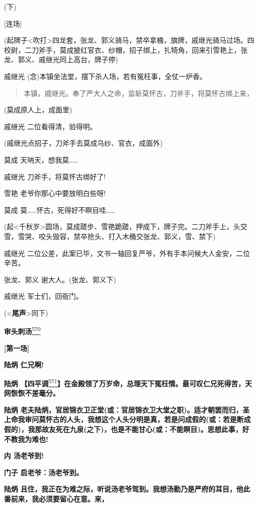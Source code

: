 (下)

{[}连场{]}

(起牌子\textless{}吹打\textgreater{}四龙套，张龙、郭义骑马，禁卒拿桶，旗牌，戚继光骑马过场。四校尉，二刀斧手，莫成披红官衣、纱帽，招子绑上，扎犄角，回来引雪艳上，张龙、郭义、戚继光同上高台，牌子停)

戚继光 (念)本镇坐法堂，摆下杀人场，若有冤枉事，全仗一炉香。

\begin{quote}
本镇，戚继光。奉了严大人之命，监斩莫怀古，刀斧手，将莫怀古绑上来，
\end{quote}

(莫成原人上，成面里)

戚继光 二位看得清，验得明。

(戚继光点招子，刀斧手去莫成乌纱、官衣，成面外)

莫成 天呐天，想我莫\ldots{}\ldots{}

戚继光 刀斧手，将莫怀古绑好了!

雪艳 老爷你那心中要放明白些呀!

莫成 莫\ldots{}\ldots{}怀古，死得好不瞑目哇\ldots{}\ldots{}

(起\textless{}千秋岁\textgreater{}圆场，莫成蹉步、雪艳跪蹉，押成下，牌子完。二刀斧手上，头交雪，雪哭、咬头毁容，禁卒抢头、打入木桶交张龙、郭义，雪、禁下)

戚继光
二位公差，此案已毕，文书一轴回复严爷，外有手本问候大人金安，二位辛苦。

张龙、郭义 谢大人。(张龙、郭义下)

戚继光 军士们，回衙门。

(\textless{}\textbf{尾声}\textgreater{}同下)

\textbf{审头刺汤}\protect\hyperlink{fn570}{\textsuperscript{570}}

\textbf{{[}第一场{]}}

\textbf{陆炳 仁兄啊!}

\textbf{陆炳
【四平调}\protect\hyperlink{fn571}{\textsuperscript{571}}\textbf{】在金殿领了万岁命，总理天下冤枉情。最可叹仁兄死得苦，天网恢恢不差毫分。}

\textbf{陆炳
老夫陆炳，官居锦衣卫正堂(或：官居锦衣卫大堂之职)。适才朝罢而归，圣上命我审问莫怀古的人头，我想这个人头分明是真，若是问成假的(或：若是断成假的)，我那故友死在九泉(之下)，也是不能甘心(或：不能瞑目)。思想此事，好不教我为难也!}

\textbf{内 汤老爷到!}

\textbf{门子 启老爷：汤老爷到。}

\textbf{陆炳
且住，我正在为难之际，听说汤老爷驾到。我想汤勤乃是严府的耳目，他此番前来，我必须要留心在意。来，}

